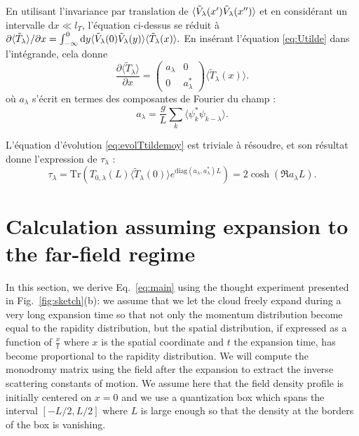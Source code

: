 \documentclass[submission,Phys,10pt]{SciPost}%
\begin{document}
{En utilisant l'invariance par translation de $\langle \Tilde{V}_{\lambda}(x')\Tilde{V}_{\lambda}(x'')\rangle$ et en considérant un intervalle $\mathrm{d}x\ll l_T$, l'équation ci-dessus se réduit à 
$\partial \langle  \tilde{T}_\lambda\rangle / \partial x =\int_{-\infty}^0 \mathrm{d} y \langle \Tilde{V}_{\lambda}(0)\Tilde{V}_{\lambda}(y)\rangle   \langle \tilde{T}_\lambda(x)\rangle . $
En insérant l'équation \ref{eq:Utilde} dans l'intégrande, cela donne 
\begin{equation}
    \frac{\partial \langle  \tilde{T}_\lambda\rangle }{\partial x }=\begin{pmatrix} a_\lambda & 0 \\ 0 & a_\lambda^*\end{pmatrix}
    \langle  \tilde{T}_\lambda(x)\rangle .   
    \label{eq:evolTtildemoy}
\end{equation}
où $a_\lambda$ s'écrit en termes des composantes de Fourier du champ : 
\begin{equation}
a_{\lambda} = \frac{g}{L}\sum_k \langle \psi_k^* \psi_{k-\lambda} \rangle .
\label{eq:alambda}
\end{equation}

L'équation d'évolution \eqref{eq:evolTtildemoy} est triviale à résoudre, et son résultat donne l'expression de $\tau_\lambda$ :
\begin{equation}
    \tau_\lambda =\mathrm{Tr} (T_{0,\lambda} (L) \langle \tilde{T}_\lambda(0)\rangle e^{\mathrm{diag}(a_\lambda,a_\lambda^*)L }  ) = 2\cosh(\Re a_\lambda L).
    \label{eq:resulttau}
\end{equation}
}
\section{Calculation assuming expansion to the far-field regime}
\label{sec:zener}
In this section, we derive Eq.~\ref{eq:main} using the thought experiment presented in  Fig.~\ref{fig:sketch}(b):  we assume that we let the cloud freely expand during a very long expansion time  so that not only the momentum distribution become equal to the rapidity distribution, but the spatial distribution, if expressed as a function of $\frac{x}{t}$ where $x$ is the spatial coordinate and $t$ the expansion time, has become proportional to the rapidity distribution. We will compute the monodromy matrix using the field after the expansion to extract the inverse scattering constants of motion.
We assume here that the field density profile is initially centered on $x=0$ and we use a quantization box which spans the interval $[-L/2,L/2]$ where $L$
is large enough so that the density at the borders of the box is vanishing.
\end{document}
